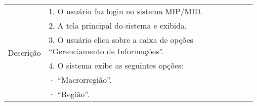 \begin{table}[!h]
\centering
\begin{tabular}{|l|l|}
\hline
\multirow{11}{*}{Descrição}                              & 1. O usuário faz login no sistema MIP/MID.                                                                                                                                                                                                                                                                                                                                               \\ \cline{2-2} 
                                                         & 2. A tela principal do sistema e exibida.                                                                                                                                                                                                                                                                                                                                                \\ \cline{2-2} 
                                                         & 3. O usuário clica sobre a caixa de opções “Gerenciamento de Informações”.                                                                                                                                                                                                                                                                                                               \\ \cline{2-2} 
                                                         & 4. O sistema exibe as seguintes opções:                                                                                                                                                                                                                                                                                                                                                  \\ \cline{2-2} 
                                                         & ·         “Macrorregião”.                                                                                                                                                                                                                                                                                                                                                                \\ \cline{2-2} 
                                                         & ·         “Região”.                                                                                                                                                                                                                                                                                                                                                                      \\ \cline{2-2} 

\end{tabular}
\end{table}
